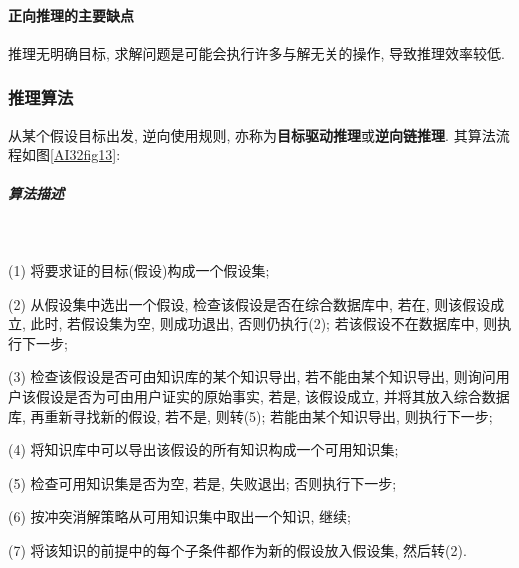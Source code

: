 \paragraph{正向推理的主要缺点}
推理无明确目标, 求解问题是可能会执行许多与解无关的操作, 导致推理效率较低.
\subsubsection{推理算法}

从某个假设目标出发, 逆向使用规则, 亦称为\textbf{目标驱动推理}或\textbf{逆向链推理}.
其算法流程如图\ref{AI32fig13}:
\subparagraph{算法描述}~{}

(1) 将要求证的目标(假设)构成一个假设集;

(2) 从假设集中选出一个假设, 检查该假设是否在综合数据库中, 若在, 则该假设成立, 此时, 若假设集为空, 则成功退出, 否则仍执行(2); 若该假设不在数据库中, 则执行下一步;

(3) 检查该假设是否可由知识库的某个知识导出, 若不能由某个知识导出, 则询问用户该假设是否为可由用户证实的原始事实, 若是, 该假设成立, 并将其放入综合数据库, 再重新寻找新的假设, 若不是, 则转(5); 若能由某个知识导出, 则执行下一步;

(4) 将知识库中可以导出该假设的所有知识构成一个可用知识集;

(5) 检查可用知识集是否为空, 若是, 失败退出; 否则执行下一步;

(6) 按冲突消解策略从可用知识集中取出一个知识, 继续;

(7) 将该知识的前提中的每个子条件都作为新的假设放入假设集, 然后转(2).

